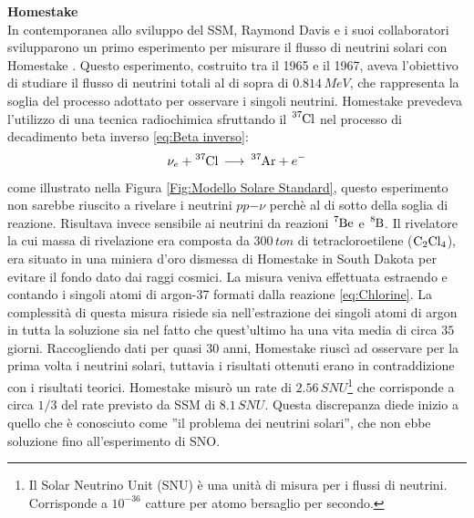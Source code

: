 \textbf{Homestake}\\
In contemporanea allo sviluppo del SSM, Raymond Davis e i suoi collaboratori svilupparono un primo esperimento per misurare il flusso di neutrini solari con Homestake \cite{Cleveland:1998nv}. Questo esperimento, costruito tra il 1965 e il 1967, aveva l'obiettivo di studiare il flusso di neutrini totali al di sopra di $0.814\,\unit{MeV}$, che rappresenta la soglia del processo adottato per osservare i singoli neutrini. Homestake prevedeva l'utilizzo di una tecnica radiochimica sfruttando il $\ce{^{37}Cl}$ nel processo di decadimento beta inverso \ref{eq:Beta inverso}:
\begin{equation}
    \nu_e+\ce{^{37}Cl}\,\longrightarrow\,\ce{^{37}Ar}+e^-
    \label{eq:Chlorine}
\end{equation}
come illustrato nella Figura \ref{Fig:Modello Solare Standard}, questo esperimento non sarebbe riuscito a rivelare i neutrini $pp$$-\nu$ perchè al di sotto della soglia di reazione. Risultava invece sensibile ai neutrini da reazioni $\ce{^7Be}$ e $\ce{^8B}$. Il rivelatore la cui massa di rivelazione era composta da $300\,\unit{ton}$ di tetracloroetilene ($\ce{C_2Cl_4}$), era situato in una miniera d'oro dismessa di Homestake in South Dakota per evitare il fondo dato dai raggi cosmici. La misura veniva effettuata estraendo e contando i singoli atomi di argon-37 formati dalla reazione \ref{eq:Chlorine}. La complessità di questa misura risiede sia nell'estrazione dei singoli atomi di argon in tutta la soluzione sia nel fatto che quest'ultimo ha una vita media di circa $35$ giorni. Raccogliendo dati per quasi 30 anni, Homestake riuscì ad osservare per la prima volta i neutrini solari, tuttavia i risultati ottenuti erano in contraddizione con i risultati teorici. Homestake misurò un rate di $2.56\,\unit{SNU}$\footnote{Il Solar Neutrino Unit (SNU) è una unità di misura per i flussi di neutrini. Corrisponde a $10^{-36}$ catture per atomo bersaglio per secondo.} che corrisponde a circa $1/3$ del rate previsto da SSM di $8.1\,\unit{SNU}$. Questa discrepanza diede inizio a quello che è conosciuto come ''il problema dei neutrini solari'', che non ebbe soluzione fino all'esperimento di SNO. 

\vspace{0,5cm}

